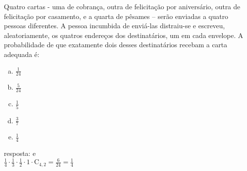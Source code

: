 \begin{ex}
Quatro cartas - uma de cobrança, outra de felicitação por aniversário, outra de felicitação por casamento, e a quarta de pêsames – serão enviadas a quatro pessoas diferentes. A pessoa incumbida de enviá-las distraiu-se e escreveu, aleatoriamente, os quatros endereços dos destinatários, um em cada envelope. A probabilidade de que exatamente dois desses destinatários recebam a carta adequada é:
   \begin{enumerate}[(a)]
   \item $\frac{1}{24}$
   \item $\frac{5}{24}$
   \item $\frac{1}{5}$
   \item $\frac{3}{7}$
   \item $\frac{1}{4}$
   \end{enumerate}
     \begin{sol}
      resposta: e \\
      $\frac{1}{4}\cdot\frac{1}{3}\cdot\frac{1}{2}\cdot1\cdot \mathrm{C}_{4,2}=\frac{6}{24}=\frac{1}{4}$
     \end{sol}
\end{ex}